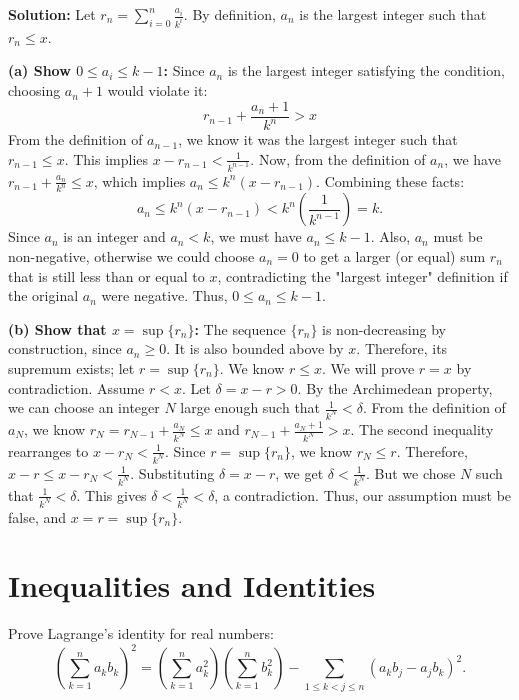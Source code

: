     \textbf{Solution:}
    Let \( r_n = \sum_{i=0}^n \frac{a_i}{k^i} \). By definition, \( a_n \) is the largest integer such that \( r_n \leq x \).
    
    \textbf{(a) Show \( 0 \leq a_i \leq k - 1 \):}
    Since \( a_n \) is the largest integer satisfying the condition, choosing \( a_n + 1 \) would violate it:
    \[
    r_{n-1} + \frac{a_n + 1}{k^n} > x
    \]
    From the definition of \(a_{n-1}\), we know it was the largest integer such that \( r_{n-1} \le x \). This implies $x - r_{n-1} < \frac{1}{k^{n-1}}$.
    Now, from the definition of $a_n$, we have $r_{n-1} + \frac{a_n}{k^n} \leq x$, which implies $a_n \leq k^n(x - r_{n-1})$.
    Combining these facts:
    \[
    a_n \leq k^n(x - r_{n-1}) < k^n\left(\frac{1}{k^{n-1}}\right) = k.
    \]
    Since $a_n$ is an integer and $a_n < k$, we must have $a_n \leq k-1$. Also, $a_n$ must be non-negative, otherwise we could choose $a_n=0$ to get a larger (or equal) sum $r_n$ that is still less than or equal to $x$, contradicting the "largest integer" definition if the original $a_n$ were negative. Thus, $0 \leq a_n \leq k-1$.
    
    \textbf{(b) Show that \( x = \sup \{ r_n \} \):}
    The sequence $\{r_n\}$ is non-decreasing by construction, since $a_n \ge 0$. It is also bounded above by $x$. Therefore, its supremum exists; let $r = \sup\{r_n\}$. We know $r \le x$.
    We will prove $r=x$ by contradiction. Assume $r < x$. Let $\delta = x - r > 0$.
    By the Archimedean property, we can choose an integer $N$ large enough such that $\frac{1}{k^N} < \delta$.
    From the definition of $a_N$, we know $r_N = r_{N-1} + \frac{a_N}{k^N} \le x$ and $r_{N-1} + \frac{a_N+1}{k^N} > x$.
    The second inequality rearranges to $x - r_N < \frac{1}{k^N}$.
    Since $r = \sup\{r_n\}$, we know $r_N \leq r$.
    Therefore, $x - r \leq x - r_N < \frac{1}{k^N}$.
    Substituting $\delta = x-r$, we get $\delta < \frac{1}{k^N}$.
    But we chose $N$ such that $\frac{1}{k^N} < \delta$. This gives $\delta < \frac{1}{k^N} < \delta$, a contradiction.
    Thus, our assumption must be false, and $x = r = \sup\{r_n\}$.

\section{Inequalities and Identities}
\begin{problembox}
    Prove Lagrange’s identity for real numbers:
    \[
    \left( \sum_{k=1}^n a_k b_k \right)^2 = \left( \sum_{k=1}^n a_k^2 \right)\left( \sum_{k=1}^n b_k^2 \right) - \sum_{1 \leq k < j \leq n} (a_k b_j - a_j b_k)^2.
    \]
    \end{problembox}
    
